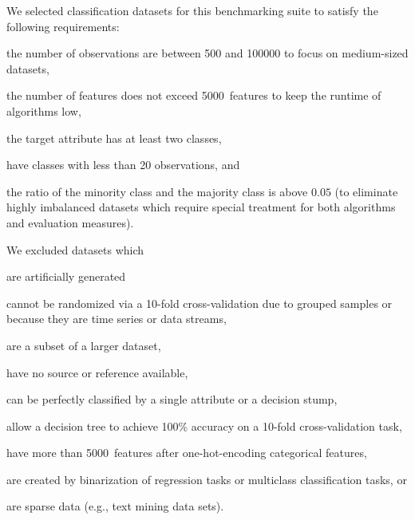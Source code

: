 \documentclass[twoside,11pt]{article}
\begin{document}
We selected classification datasets for this benchmarking suite to satisfy the following requirements:
\begin{enumerate*}[(a)]
  \item the number of observations are between \num{500} and \num{100000} to focus on medium-sized datasets,
  \item the number of features does not exceed \num{5000}~features to keep the runtime of algorithms low,
  \item the target attribute has at least two classes,
  \item have classes with less than 20 observations, and\
  \item the ratio of the minority class and the majority class is above $0.05$ (to eliminate highly imbalanced datasets which require special treatment for both algorithms and evaluation measures).
\end{enumerate*}
We excluded datasets which
\begin{enumerate*}[(a)]
  \item are artificially generated %
  \item cannot be randomized via a 10-fold cross-validation due to grouped samples or because they are time series or data streams,
  \item are a subset of a larger dataset, %
  \item have no source or reference available,
  \item can be perfectly classified by a single attribute or a decision stump,
  \item allow a decision tree to achieve 100\% accuracy on a 10-fold cross-validation task,
  \item have more than \num{5000}~features after one-hot-encoding categorical features,
  \item are created by binarization of regression tasks or multiclass classification tasks, or
  \item are sparse data (e.g., text mining data sets).
\end{enumerate*}
\end{document}
